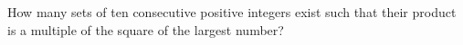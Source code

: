 How many sets of ten consecutive positive integers exist such that their product is a multiple of the square of the largest number?
